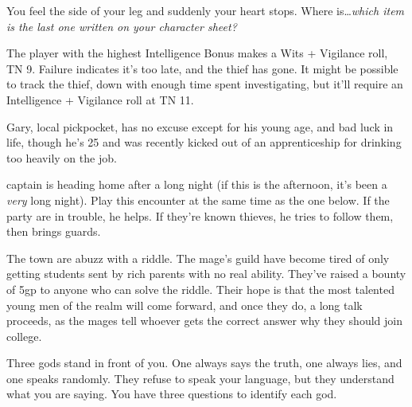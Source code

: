 \begin{multicols}{2}

\resumecontents[Town]

\label{randommeetings}


\begin{boxtext}

	You feel the side of your leg and suddenly your heart stops.  Where is\ldots \textit{which item is the last one written on your character sheet?}

\end{boxtext}

The player with the highest Intelligence Bonus makes a Wits + Vigilance roll, TN 9.  Failure indicates it's too late, and the thief has gone.  It might be possible to track the thief, down with enough time spent investigating, but it'll require an Intelligence + Vigilance roll at TN 11.

Gary, local pickpocket, has no excuse except for his young age, and bad luck in life, though he's 25 and was recently kicked out of an apprenticeship for drinking too heavily on the job.

\humanthief


\captain

\Gls{captain} is heading home after a long night (if this is the afternoon, it's been a \emph{very} long night).  Play this encounter at the same time as the one below.  If the party are in trouble, he helps.  If they're known thieves, he tries to follow them, then brings guards.


The town are abuzz with a riddle.  The mage's guild have become tired of only getting students sent by rich parents with no real ability.  They've raised a bounty of 5gp to anyone who can solve the riddle.  Their hope is that the most talented young men of the realm will come forward, and once they do, a long talk proceeds, as the mages tell whoever gets the correct answer why they should join \gls{college}.

\begin{boxtext}
Three gods stand in front of you.  One always says the truth, one always lies, and one speaks randomly.  They refuse to speak your language, but they understand what you are saying.  You have three questions to identify each god.
\end{boxtext}


\end{multicols}
